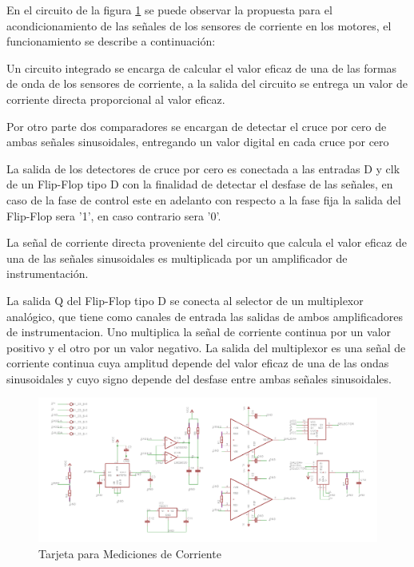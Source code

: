 En el circuito de la figura \ref{fig:TarjetaCorriente} se puede observar la propuesta para el acondicionamiento de las señales de los sensores de corriente en los motores, el funcionamiento se describe a continuación:

\begin{description}
\item Un circuito integrado se encarga de calcular el valor eficaz de una de las formas de onda de los sensores de corriente, a la salida del circuito se entrega un valor de corriente directa proporcional al valor eficaz.

\item Por otro parte dos comparadores se encargan de detectar el cruce por cero de ambas señales sinusoidales, entregando un valor digital en cada cruce por cero

\item La salida de los detectores de cruce por cero es conectada a las entradas D y clk de un Flip-Flop tipo D con la finalidad de detectar el desfase de las señales, en caso de la fase de control este en adelanto con respecto a la fase fija la salida del Flip-Flop sera '1', en caso contrario sera '0'.

\item La señal de corriente directa proveniente del circuito que calcula el valor eficaz de una de las señales sinusoidales es multiplicada por un amplificador de instrumentación.

\item La salida Q del Flip-Flop tipo D se conecta al selector de un multiplexor analógico, que tiene como canales de entrada las salidas de ambos amplificadores de instrumentacion. Uno multiplica la señal de corriente continua por un valor positivo y el otro por un valor negativo. La salida del multiplexor es una señal de corriente continua cuya amplitud depende del valor eficaz de una de las ondas sinusoidales y cuyo signo depende del desfase entre ambas señales sinusoidales.


\end{description}



\begin{figure}
\centering
\includegraphics[scale=0.8]{FiguresP/EsquemaMotores}
\caption{Tarjeta para Mediciones de Corriente}
\label{fig:TarjetaCorriente}
\end{figure}




